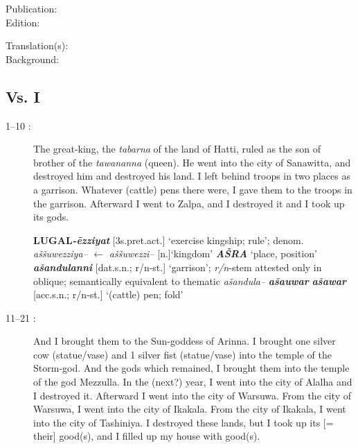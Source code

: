 \documentclass[10pt]{article}
\newcommand{\bit}[1]{\textbf{\textit{#1}}}				%
\newcommand{\p}[1]{{\tiny[{#1}]}}					%
\newcommand{\hith}{\textsubwedge{h}}
\renewcommand{\.}[1]{\textsubdot{#1}}
\begin{document}
\begin{description}

\item[Publication:] 
\item[Edition:] \citet{demartino2003hittite}
\item[Translation(s):] 
\item[Background:] 

\end{description}

\subsection{Vs. I}

\begin{description}

\item[1--10 :] The great-king, the \textit{tabarna} of the land of Hatti, ruled as the son of brother of the \textit{tawananna} (queen). He went into the city of Sanawitta, and destroyed him and destroyed his land. I left behind troops in two places as a garrison. Whatever (cattle) pens there were, I gave them to the troops in the garrison. Afterward I went to Zalpa, and I destroyed it and I took up its gods.

\begin{notes}

\textbf{LUGAL\bit{-\=ezziyat}} \p{3s.pret.act.} `exercise kingship; rule'; denom. \textit{{\hith}a\v{s}\v{s}uwezziya--} $\leftarrow$ \textit{{\hith}a\v{s}\v{s}uwezzi--} \p{n.}`kingdom' \bit{A\v{S}RA} `place, position' \bit{a\v{s}andulanni} \p{dat.s.n.; r/n-st.} `garrison'; \textit{r/n}-stem attested only in oblique; semantically equivalent to thematic \textit{a\v{s}andula--} \bit{a\v{s}auwar} \bit{a\v{s}awar} \p{acc.s.n.; r/n-st.} `(cattle) pen; fold'

\end{notes}

\item[11--21 :] And I brought them to the Sun-goddess of Arinna. I brought one silver cow (statue/vase) and 1 silver fist (statue/vase) into the temple of the Storm-god. And the gods which remained, I brought them into the temple of the god Mezzulla. In the (next?) year, I went into the city of Alalha and I destroyed it. Afterward I went into the city of Warsuwa. From the city of Warsuwa, I went into the city of Ikakala. From the city of Ikakala, I went into the city of Tashiniya. I destroyed these lands, but I took up its [= their] good(s), and I filled up my house with good(s). 


\end{description}
\end{document}
